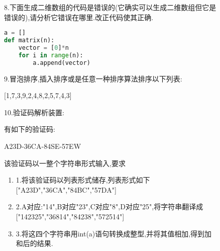 \documentclass[12pt,a4paper]{article}
\begin{document}
\begin{figure}[H]
8.下面生成二维数组的代码是错误的(它确实可以生成二维数组但它是错误的),请分析它错误在哪里.改正代码使其正确.
\begin{lstlisting}[language=Python]
a = []
def matrix(n):
    vector = [0]*n
    for i in range(n):
        a.append(vector)
\end{lstlisting}
\end{figure}

\begin{figure}[H]
9.冒泡排序,插入排序或是任意一种排序算法排序以下列表:

[1,7,3,9,2,4,8,2,5,7,4,3]

\end{figure}

\begin{figure}[H]
10.验证码解析装置: 

有如下的验证码:

A23D-36CA-84SE-57EW

该验证码以一整个字符串形式输入,要求
\begin{enumerate}
\item 1.将该验证码以列表形式储存,列表形式如下["A23D","36CA","84BC","57DA"]
\item 2.A对应:"14",B对应"23",C对应"8",D对应"25",将字符串翻译成["142325","36814","84238","572514"]
\item 3.将这四个字符串用int(a)语句转换成整型,并将其值相加,得到加和后的结果.

\end{enumerate}

\end{figure}


    
\end{document}
